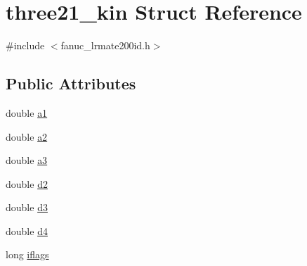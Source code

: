 \hypertarget{structthree21__kin}{\section{three21\-\_\-kin Struct Reference}
\label{structthree21__kin}
}


{\ttfamily \#include $<$fanuc\-\_\-lrmate200id.\-h$>$}

\subsection*{Public Attributes}
\begin{DoxyCompactItemize}
\item 
double \hyperlink{structthree21__kin_a45aab53e691d71c6a7c66458c7306a54}{a1}
\item 
double \hyperlink{structthree21__kin_aadc281e22d245e3ea7d0ab32a6763909}{a2}
\item 
double \hyperlink{structthree21__kin_a7c7854d400f02a38c79ac5c93c675fab}{a3}
\item 
double \hyperlink{structthree21__kin_acc548b9be80794aa0a1a452943948dd8}{d2}
\item 
double \hyperlink{structthree21__kin_acec9cbbe4c2e53b5b56530b12ab01627}{d3}
\item 
double \hyperlink{structthree21__kin_a8b7938d9df9ce3a8a3bf58fb2c27b119}{d4}
\item 
long \hyperlink{structthree21__kin_a0635045024d80c336c4082c0a1dac24a}{iflags}
\end{DoxyCompactItemize}


